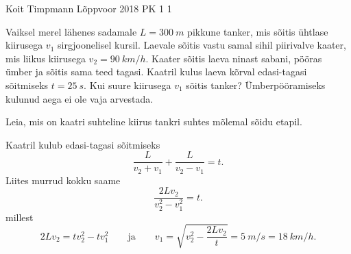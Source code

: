 {Koit Timpmann} %
{Lõppvoor} %
{2018} %
{PK 1} %
{1} %
{
\ifStatement

    Vaiksel merel lähenes sadamale $L = \SI{300}{m}$ pikkune tanker, mis sõitis ühtlase kiirusega $v_1$ sirgjoonelisel kursil. Laevale sõitis vastu samal sihil piirivalve kaater, mis liikus kiirusega $v_2 = \SI{90}{km/h}$. Kaater sõitis laeva ninast sabani, pööras ümber ja sõitis sama teed tagasi. Kaatril kulus laeva kõrval edasi-tagasi sõitmiseks $t = \SI{25}{s}$. Kui suure kiirusega $v_1$ sõitis tanker? Ümberpööramiseks kulunud aega ei ole vaja arvestada.

\fi


\ifHint
Leia, mis on kaatri suhteline kiirus tankri suhtes mõlemal sõidu etapil.
\fi


\ifSolution
Kaatril kulub edasi-tagasi sõitmiseks
\[ \frac{L}{v_2+v_1} + \frac{L}{v_2 - v_1} =t. \] 
Liites murrud kokku saame
\[ \frac{2Lv_2}{v_2^2 - v_1^2} = t. \] 
millest
\[ 2Lv_2 = tv_2^2 - tv_1^2\quad\quad\text{ja}\quad\quad v_1 = \sqrt{v_2^2 - \frac{2Lv_2}{t}} = \SI{5}{m/s} = \SI{18}{km/h}. \]
\fi
}